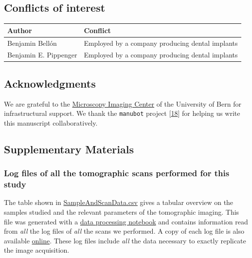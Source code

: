 \hypertarget{conflicts-of-interest}{%
\subsection{Conflicts of interest}\label{conflicts-of-interest}}

\begin{tablenos:no-prefix-table-caption}

\begin{longtable}[]{@{}ll@{}}
\toprule()
Author & Conflict \\
\midrule()
\endhead
Benjamin Bellón & Employed by a company producing dental implants \\
Benjamin E. Pippenger & Employed by a company producing dental implants \\
\bottomrule()
\end{longtable}

\end{tablenos:no-prefix-table-caption}

\hypertarget{acknowledgments}{%
\subsection{Acknowledgments}\label{acknowledgments}}

We are grateful to the \href{https://mic.unibe.ch/}{Microscopy Imaging Center} of the University of Bern for infrastructural support.
We thank the \texttt{manubot} project {[}\protect\hyperlink{ref-YuJbg3zO}{18}{]} for helping us write this manuscript collaboratively.

\hypertarget{supplementary-materials}{%
\subsection{Supplementary Materials}\label{supplementary-materials}}

\hypertarget{log-files-of-all-the-tomographic-scans-performed-for-this-study}{%
\subsubsection{Log files of all the tomographic scans performed for this study}\label{log-files-of-all-the-tomographic-scans-performed-for-this-study}}

The table shown in \href{https://github.com/microct-ana-unibe-ch/microvasculature-manuscript/blob/main/content/data/SampleAndScanData.csv}{SampleAndScanData.csv} gives a tabular overview on the samples studied and the relevant parameters of the tomographic imaging.
This file was generated with a \href{https://github.com/habi/BrukerSkyScanLogfileRuminator/tree/microvasculature-manuscript}{data processing notebook} and contains information read from \emph{all} the log files of \emph{all} the scans we performed.
A copy of each log file is also available \href{https://github.com/microct-ana-unibe-ch/microvasculature-manuscript/tree/main/content/data}{online}.
These log files include \emph{all} the data necessary to exactly replicate the image acquisition.

